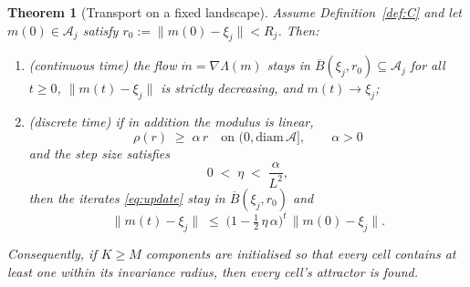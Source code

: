 \documentclass[11pt]{article}
\newtheorem{theorem}{Theorem}[section]
\theoremstyle{definition}
\newcommand{\cA}{\mathcal{A}}
\begin{document}
\begin{theorem}[Transport on a fixed landscape]\label{thm:part2}
Assume Definition~\ref{def:C} and let $m(0) \in \cA_j$ satisfy
$r_0 := \|m(0) - \xi_j\| < R_j$. Then:
\begin{enumerate}
\item[(a)] \emph{(continuous time)} the flow $\dot m = \nabla\Lambda(m)$ stays in
  $\overline{B}(\xi_j, r_0) \subseteq \cA_j$ for all $t \ge 0$,
  $\|m(t) - \xi_j\|$ is strictly decreasing, and $m(t) \to \xi_j$;
\item[(b)] \emph{(discrete time)} if in addition the modulus is linear,
  \begin{equation}\label{eq:Lpart2}
    \rho(r) \;\ge\; \alpha\,r \quad\text{on } (0, \mathrm{diam}\,\cA],
    \qquad \alpha > 0 \tag{L}
  \end{equation}
  and the step size satisfies
  \begin{equation}\label{eq:step2}
    0 \;<\; \eta \;<\; \frac{\alpha}{L^2},
  \end{equation}
  then the iterates \eqref{eq:update} stay in $\overline{B}(\xi_j, r_0)$ and
  \begin{equation}\label{eq:geo}
    \|m(t) - \xi_j\| \;\le\;
    \Big(1 - \tfrac12\,\eta\,\alpha\Big)^{t}\,\|m(0) - \xi_j\| .
  \end{equation}
\end{enumerate}
Consequently, if $K \ge M$ components are initialised so that every cell
contains at least one \emph{within its invariance radius}, then every cell's
attractor is found.
\end{theorem}
\end{document}
